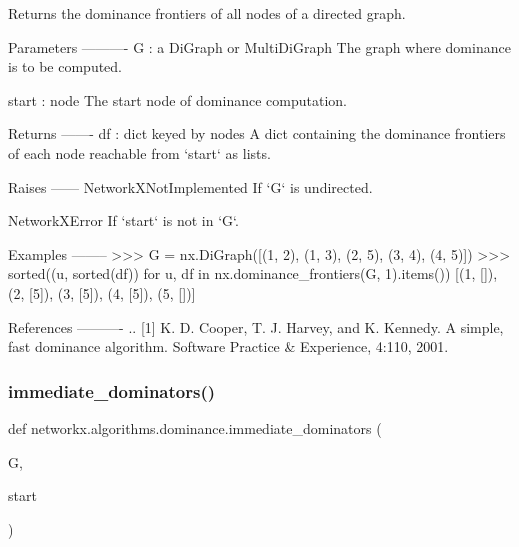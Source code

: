 \begin{DoxyVerb}Returns the dominance frontiers of all nodes of a directed graph.

Parameters
----------
G : a DiGraph or MultiDiGraph
    The graph where dominance is to be computed.

start : node
    The start node of dominance computation.

Returns
-------
df : dict keyed by nodes
    A dict containing the dominance frontiers of each node reachable from
    `start` as lists.

Raises
------
NetworkXNotImplemented
    If `G` is undirected.

NetworkXError
    If `start` is not in `G`.

Examples
--------
>>> G = nx.DiGraph([(1, 2), (1, 3), (2, 5), (3, 4), (4, 5)])
>>> sorted((u, sorted(df)) for u, df in nx.dominance_frontiers(G, 1).items())
[(1, []), (2, [5]), (3, [5]), (4, [5]), (5, [])]

References
----------
.. [1] K. D. Cooper, T. J. Harvey, and K. Kennedy.
       A simple, fast dominance algorithm.
       Software Practice & Experience, 4:110, 2001.
\end{DoxyVerb}
 \mbox{\label{namespacenetworkx_1_1algorithms_1_1dominance_a27ba6c00f9beb6723e8bee0dcd08ea4c}} 
\subsubsection{\texorpdfstring{immediate\+\_\+dominators()}{immediate\_dominators()}}
{\footnotesize\ttfamily def networkx.\+algorithms.\+dominance.\+immediate\+\_\+dominators (\begin{DoxyParamCaption}\item[{}]{G,  }\item[{}]{start }\end{DoxyParamCaption})}

